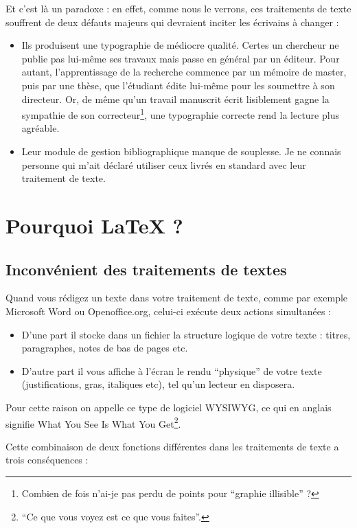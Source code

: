 Et c'est là un paradoxe : en effet, comme nous le verrons, ces traitements de texte souffrent de deux défauts majeurs qui devraient inciter les écrivains à changer :
\begin{itemize}
\item Ils produisent une typographie de médiocre qualité. Certes un chercheur ne publie pas lui-même ses travaux mais passe en général par un éditeur. Pour autant, l'apprentissage de la recherche commence par un mémoire de master, puis par une thèse, que l'étudiant édite lui-même pour les soumettre à son directeur. Or, de même qu'un travail manuscrit écrit lisiblement gagne la sympathie de son correcteur\footnote{Combien de fois n'ai-je pas perdu de points pour \enquote{graphie illisible} ?},  une typographie correcte rend la lecture plus agréable.
\item Leur module de gestion bibliographique manque de souplesse. Je ne connais personne qui m'ait déclaré utiliser ceux livrés en standard avec leur traitement de texte.
\end{itemize}

\section{Pourquoi \LaTeX{} ?}

\subsection{Inconvénient des traitements de textes}

Quand vous rédigez un texte dans votre traitement de texte, comme par exemple Microsoft Word ou Openoffice.org, celui-ci exécute deux actions simultanées :

\begin{itemize}
\item D'une part il stocke dans un fichier la structure logique de votre texte : titres, paragraphes, notes de bas de pages etc.
\item D'autre part il vous affiche à l'écran le rendu \enquote{physique} de votre texte (justifications, gras, italiques etc), tel qu'un lecteur en disposera.
\end{itemize}

Pour cette raison on appelle ce type de logiciel WYSIWYG, ce qui en anglais signifie \textenglish{What You See Is What You Get}\footnote{\enquote{Ce que vous voyez est ce que vous faites}.}. 

Cette combinaison de deux fonctions différentes dans les  traitements de texte a trois conséquences :

